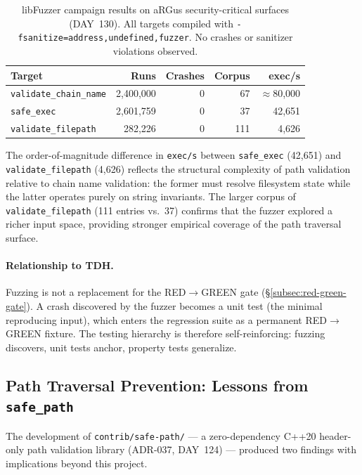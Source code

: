 \documentclass[11pt,a4paper]{article}
\begin{document}
    \begin{table}[h]
    \centering
    \caption{libFuzzer campaign results on aRGus security-critical surfaces (DAY~130).
    All targets compiled with \texttt{-fsanitize=address,undefined,fuzzer}.
    No crashes or sanitizer violations observed.}
    \label{tab:fuzzing-results}
    \begin{tabular}{lrrrr}
    \toprule
    \textbf{Target} & \textbf{Runs} & \textbf{Crashes} & \textbf{Corpus} & \textbf{exec/s} \\
    \midrule
    \texttt{validate\_chain\_name} & 2{,}400{,}000 & 0 & 67 & $\approx$80{,}000 \\
    \texttt{safe\_exec} & 2{,}601{,}759 & 0 & 37 & 42{,}651 \\
    \texttt{validate\_filepath} & 282{,}226 & 0 & 111 & 4{,}626 \\
    \bottomrule
    \end{tabular}
    \end{table}

    The order-of-magnitude difference in \texttt{exec/s} between
    \texttt{safe\_exec} (42{,}651) and \texttt{validate\_filepath} (4{,}626)
    reflects the structural complexity of path validation relative to chain name
    validation: the former must resolve filesystem state while the latter operates
    purely on string invariants. The larger corpus of \texttt{validate\_filepath}
    (111 entries vs.\ 37) confirms that the fuzzer explored a richer input space,
    providing stronger empirical coverage of the path traversal surface.

    \paragraph{Relationship to TDH.}
    Fuzzing is not a replacement for the RED$\to$GREEN gate
    (\S\ref{subsec:red-green-gate}). A crash discovered by the fuzzer becomes a
    unit test (the minimal reproducing input), which enters the regression suite
    as a permanent RED$\to$GREEN fixture. The testing hierarchy is therefore
    self-reinforcing: fuzzing discovers, unit tests anchor, property tests
    generalize.

    \subsection{Path Traversal Prevention: Lessons from \texttt{safe\_path}}
    \label{subsec:safe-path-lessons}

    The development of \texttt{contrib/safe-path/} --- a zero-dependency C++20 header-only
    path validation library (ADR-037, DAY~124) --- produced two findings with implications
    beyond this project.
\end{document}

